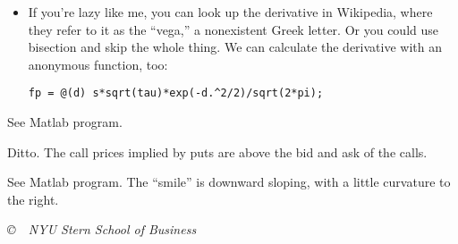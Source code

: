 \documentclass[11pt]{exam}
\begin{document}
\begin{questions}
{\begin{itemize}
\item If you're lazy like me, you can look up the derivative in Wikipedia,
where they refer to it as the ``vega,'' a nonexistent Greek letter.
Or you could use bisection and skip the whole thing.
We can calculate the derivative with an anonymous function, too:
\begin{verbatim}
fp = @(d) s*sqrt(tau)*exp(-d.^2/2)/sqrt(2*pi);
\end{verbatim}

\end{itemize}
}

\begin{solution}
\begin{parts}
\item See Matlab program. 
\item Ditto.  The call prices implied by puts are above the bid and ask of the calls.  
\item See Matlab program. The ``smile'' is downward sloping, with a little curvature
to the right.  
\end{parts}
\end{solution}

\end{questions}

\vfill \centerline{\it \copyright \ \number\year \ NYU Stern School of Business}
\end{document}
